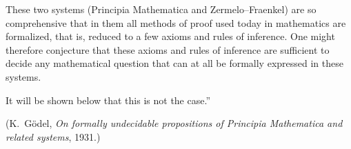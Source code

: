 \documentclass[10pt]{beamer}
\begin{document}
\begin{frame}
These two systems ({\color{arancio}Principia Mathematica and Zermelo--Fraenkel}) are so comprehensive that in them all methods of proof used today in mathematics are formalized, that is, reduced to a few axioms and rules of inference. One might therefore conjecture that these axioms and rules of inference are sufficient to decide any mathematical question that can at all be formally expressed in these systems.   
\pause

It will be shown below that this is not the case.''

\vspace{.25cm}

(K.~Gödel, \emph{ On formally undecidable propositions of Principia
Mathematica and related systems}, 1931.)
\end{frame}
\end{document}
